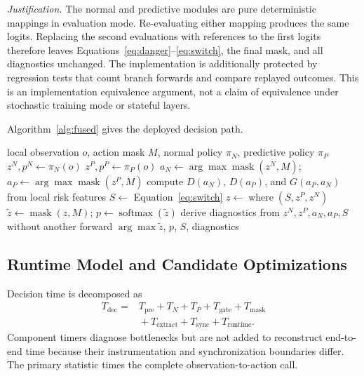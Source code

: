 \documentclass{ieeeaccess}
\begin{document}
\textit{Justification.} The normal and predictive modules are pure deterministic mappings in evaluation mode. Re-evaluating either mapping produces the same logits. Replacing the second evaluations with references to the first logits therefore leaves Equations~\eqref{eq:danger}--\eqref{eq:switch}, the final mask, and all diagnostics unchanged. The implementation is additionally protected by regression tests that count branch forwards and compare replayed outcomes. This is an implementation equivalence argument, not a claim of equivalence under stochastic training mode or stateful layers.

Algorithm~\ref{alg:fused} gives the deployed decision path.

\begin{algorithm*}[t]
\caption{DiSwitch decision}\label{alg:fused}
\begin{algorithmic}[1]
\Require local observation $o$, action mask $M$, normal policy $\pi_N$, predictive policy $\pi_P$
\State $z^N,p^N\gets\pi_N(o)$ 
\State $z^P,p^P\gets\pi_P(o)$ 
\State $a_N\gets\arg\max \operatorname{mask}(z^N,M)$; $a_P\gets\arg\max \operatorname{mask}(z^P,M)$
\State compute $D(a_N)$, $D(a_P)$, and $G(a_P,a_N)$ from local risk features
\State $S\gets$ Equation~\eqref{eq:switch}
\State $z\gets\operatorname{where}(S,z^P,z^N)$
\State $\tilde z\gets\operatorname{mask}(z,M)$; $p\gets\operatorname{softmax}(\tilde z)$
\State derive diagnostics from $z^N,z^P,a_N,a_P,S$ without another forward
\State \Return $\arg\max\tilde z$, $p$, $S$, diagnostics
\end{algorithmic}
\end{algorithm*}

\subsection{Runtime Model and Candidate Optimizations}

Decision time is decomposed as
\begin{equation}
\begin{aligned}
T_{\mathrm{dec}}={}&T_{\mathrm{pre}}+T_N+T_P+T_{\mathrm{gate}}+T_{\mathrm{mask}}\\
&{}+T_{\mathrm{extract}}+T_{\mathrm{sync}}+T_{\mathrm{runtime}}.
\end{aligned}
\end{equation}
Component timers diagnose bottlenecks but are not added to reconstruct end-to-end time because their instrumentation and synchronization boundaries differ. The primary statistic times the complete observation-to-action call.
\end{document}
